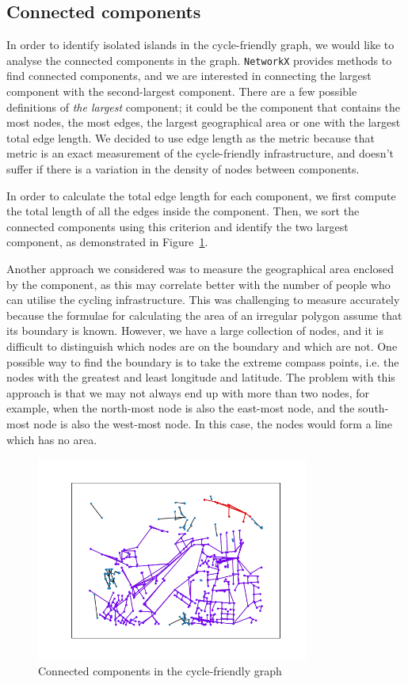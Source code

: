 \documentclass[12pt,a4paper]{report}
\begin{document}
\subsection{Connected components}
In order to identify isolated islands in the cycle-friendly graph, we would like to analyse the connected components in the graph. \texttt{NetworkX} provides methods to find connected components, and we are interested in connecting the largest component with the second-largest component. There are a few possible definitions of \textit{the largest} component; it could be the component that contains the most nodes, the most edges, the largest geographical area or one with the largest total edge length. We decided to use edge length as the metric because that metric is an exact measurement of the cycle-friendly infrastructure, and doesn't suffer if there is a variation in the density of nodes between components.

In order to calculate the total edge length for each component, we first compute the total length of all the edges inside the component. Then, we sort the connected components using this criterion and identify the two largest component, as demonstrated in Figure~\ref{fig:component}.

Another approach we considered was to measure the geographical area enclosed by the component, as this may correlate better with the number of people who can utilise the cycling infrastructure. This was challenging to measure accurately because the formulae for calculating the area of an irregular polygon assume that its boundary is known. However, we have a large collection of nodes, and it is difficult to distinguish which nodes are on the boundary and which are not. One possible way to find the boundary is to take the extreme compass points, i.e. the nodes with the greatest and least longitude and latitude. The problem with this approach is that we may not always end up with more than two nodes, for example, when the north-most node is also the east-most node, and the south-most node is also the west-most node. In this case, the nodes would form a line which has no area.

\begin{figure}[ht]
    \centering
    \includegraphics[width=0.8\textwidth,trim={2.5cm 1.5cm 1.7cm 1.7cm},clip]{diss_images/impl/components.png}
    \caption{Connected components in the cycle-friendly graph}
    \label{fig:component}
\end{figure}
\end{document}
